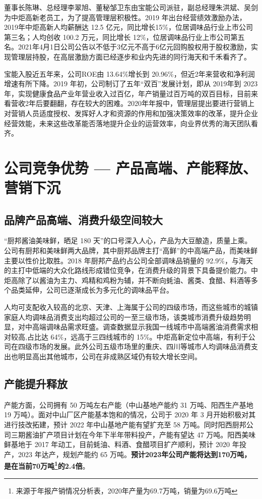 \documentclass[UTF8,a4paper,zihao=-4,fontset = windows]{ctexart} %
\begin{document}
董事长陈琳、总经理李翠旭、董秘邹卫东由宝能公司派驻，副总经理朱洪斌、吴剑为中炬高新老员工，为了提高管理层积极性。2019 年出台经营绩效激励办法，2019年中炬高新人均薪酬达 12.5 亿元，同比增长15\%，位居调味品行业上市公司第三名；人均创收 100.2 万元，同比增长 12\%，位居调味品行业上市公司第五名。2021年4月1日公司公告以不低于3亿元不高于6亿元回购股权用于股权激励，实现管理层持股，在高层激励方面已经逐步和业内先进的同行海天和千禾看齐了。

宝能入股近五年来，公司ROE由 13.64\%增长到 20.96\%，但近2年来营收和净利润增速有所下降。2019 年初，公司制订了五年“双百”发展计划，即从 2019年到 2023年，实现健康食品产业年营业收入过百亿，年产销量过百万吨的双百目标，目前来看营收2年后要翻翻，存在较大的困难。2020年年报中，管理层提出要进行营销上对营销人员适度授权、发挥好人才和资源的作用和加强决策效率的改革，提升企业经营效能，未来这些改革能否落地提升企业的运营效率，向业界优秀的海天团队看齐。

\section{公司竞争优势 — 产品高端、产能释放、营销下沉}
\subsection{品牌产品高端、消费升级空间较大}
“厨邦酱油美味鲜，晒足 180 天”的口号深入人心，产品为大豆酿造，质量上乘。公司有厨邦和美味鲜两大品牌，其中厨邦品牌主打“高鲜”的中高端产品，而美味鲜主要以性价比取胜。2018 年厨邦产品约占公司全部调味品销量的 92.9\%，与海天的主打中低端的大众化路线形成错位竞争，在消费升级的背景下具备提价能力。中炬高除了以酱油为主力、鸡精和鸡粉为辅，并不断向蚝油、酱类、食醋、料酒等多个品类延伸，公司已逐渐成长为多元化的调味品平台。

人均可支配收入较高的北京、天津、上海属于公司的四级市场，而这些城市的城镇家庭人均调味品消费支出均超过公司的一至三级市场，该类城市消费升级趋势明显，对中高端调味品需求旺盛。调查数据显示我国一线城市中高端酱油消费需求相对较高,占比达 64\%，远高于三四线城市的 15\%。中炬高新定位中高端，有利于公司在四级市场的发展。此外公司五级市场里的重庆、四川等城市人均调味品消费支出也明显高出其他城市，公司在非成熟区域仍有较大增长空间。
\subsection{产能提升释放}
产能方面，公司拥有 50 万吨左右产能（中山基地产能约 31 万吨、阳西生产基地 19 万吨）。面对中山厂区产能基本饱和的情况，公司于 2020 年 3 月开始积极对其进行技改拓建，预计 2022 年中山基地产能有望扩充至 58 万吨。同时阳西厨邦公司三期酱油扩产项目计划在今年下半年带料投产，产能有望达 47 万吨。阳西美味鲜基地于 2017 年动工，目前蚝油、料酒、食醋项目扩产顺利，预计 2020 年投产，2023 年达产，规划产能约 65 万吨。\textbf{预计2023年公司产能将达到170万吨，是在当前70万吨\footnote{来源于年报产销情况分析表，2020年产量为69.7万吨，销量为69.6万吨}的2.4倍}。
\end{document}
